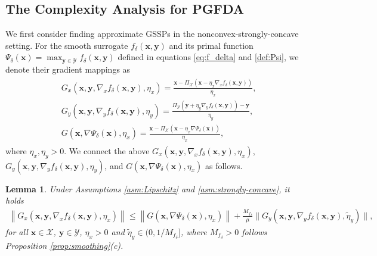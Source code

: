 \documentclass[11pt]{article}
\def\vx{\mathbf{x}}
\def\vy{\mathbf{y}}
\def\fX{{\mathcal{X}}}
\def\fY{{\mathcal{Y}}}
\newcommand{\norm}[1]{\left\| #1 \right\|}
\newtheorem{lemma}{Lemma}
\begin{document}
\subsection{The Complexity Analysis for PGFDA}\label{sec:convergence-PGFDA}

We first consider finding approximate GSSPs in the nonconvex-strongly-concave setting.
For the smooth surrogate $f_\delta(\vx,\vy)$ and its primal function $\Psi_\delta(\vx)=\max_{\vy\in\fY}f_\delta(\vx,\vy)$ defined in equations \eqref{eq:f_delta} and \eqref{def:Psi}, we 
denote their gradient mappings as
\begin{align}\label{eq:mapping-smooth}
\begin{split}
    & G_x(\vx, \vy,\nabla_x f_\delta(\vx,\vy),\eta_x) = \frac{\vx-\Pi_\mathcal{X}\left(\vx - \eta_x \nabla_x f_\delta(\vx,\vy)\right) }{\eta_x}, \\
    & G_y(\vx, \vy,\nabla_y f_\delta(\vx,\vy),\eta_y) = \frac{\Pi_\mathcal{Y}\left(\vy + \eta_y \nabla_y f_\delta(\vx,\vy)\right) - \vy}{\eta_y}, \\
    & G(\vx, \nabla \Psi_\delta(\vx),\eta_x) = \frac{\vx-\Pi_\mathcal{X}\left(\vx - \eta_x \nabla\Psi_\delta(\vx)\right) }{\eta_x},    
\end{split}    
\end{align}
where $\eta_x,\eta_y>0$.
We connect the above $G_x(\vx, \vy,\nabla_x f_\delta(\vx,\vy),\eta_x)$, 
$G_y(\vx, \vy,\nabla_y f_\delta(\vx,\vy),\eta_y)$, 
and $G(\vx, \nabla \Psi_\delta(\vx),\eta_x)$ as follows.

\begin{lemma}\label{lemma: gradient mapping between Psi_delta and f_delta}
Under Assumptions \ref{asm:Lipschitz} and \ref{asm:strongly-concave}, 
it holds  
\begin{align*}
\norm{G_x(\vx,\vy,\nabla_x f_\delta(\vx,\vy),\eta_x)}
\leq\norm{G(\vx,\nabla \Psi_\delta(\vx),\eta_x)} + \frac{M_{f_\delta}}{\mu}\| G_y(\vx, \vy,\nabla_y f_\delta(\vx,\vy),\tilde\eta_y) \|,
\end{align*}
for all $\vx\in\fX$, $\vy\in\fY$, $\eta_x>0$ and $\tilde\eta_y\in(0,1/M_{f_\delta}]$, 
where 
$M_{f_\delta}>0$ follows Proposition \ref{prop:smoothing}(c).


\end{lemma}
\end{document}
